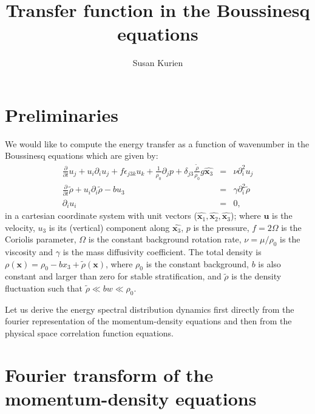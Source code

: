 \documentclass[12pt]{article}
\title{Transfer function in the Boussinesq equations}
\author{Susan Kurien}
\begin{document}
\section{Preliminaries}
We would like to compute the energy transfer as a function of
wavenumber in the Boussinesq equations which are given by:
\begin{eqnarray}
\frac{\partial}{\partial t}{u}_j + u_i \partial_i u_j + f\epsilon_{j3k}u_k +
\frac{1}{\rho_0}\partial_j p + \delta_{j3}\frac{\tilde\rho}{\rho_0}g\hat{\bm{x}_3} &=&
\nu \partial_i^2 u_j\label{momentum}\\ \frac{\partial}{\partial t}\tilde\rho+u_i \partial_i \tilde\rho  -
bu_3 &=& \gamma \partial_i^2 \tilde \rho \label{density}\\ \partial_i u_i &=& 0,
\label{bous}
\end{eqnarray}
in a cartesian coordinate system with unit vectors ($\hat{\bm{x}_1},
\hat{\bm{x}_2}, \hat{\bm{x}_3}$); where $\bm{u}$ is the velocity, $u_3$ is
its (vertical) component along $\hat{\bm{x}_3}$, $p$ is the pressure, $f=2\Omega$ is the
Coriolis parameter, $\Omega$ is the constant background rotation rate,
$\nu = \mu/\rho_0$ is the viscosity and $\gamma$ is the mass
diffusivity coefficient.  The total density is $\rho(\bm{x}) = \rho_0
- bx_3 + \tilde\rho(\bm{x})$, where $\rho_0$ is the constant
background, $b$ is also constant and larger than zero for stable
stratification, and $\tilde \rho$ is the density fluctuation such that
$\tilde \rho \ll bw \ll \rho_0$.

Let us derive the energy spectral distribution dynamics first directly
from the fourier representation of the momentum-density equations and
then from the physical space correlation function equations.

\section{Fourier transform of the momentum-density equations}
\end{document}
